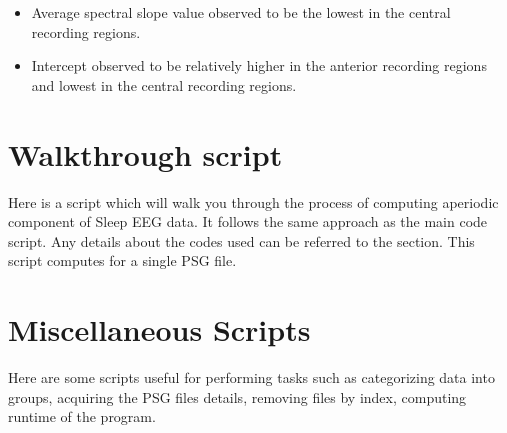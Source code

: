 \documentclass[letterpaper,10pt,english]{sphinxmanual}
\begin{document}

\sphinxAtStartPar
{}
\begin{itemize}
\item {} 
\sphinxAtStartPar
Average spectral slope value observed to be the lowest in the central recording regions.

\item {} 
\sphinxAtStartPar
Intercept observed to be relatively higher in the anterior recording regions and lowest in the central recording regions.

\end{itemize}


\chapter{Walk\sphinxhyphen{}through script}
\label{\detokenize{walk-through_script:walk-through-script}}\label{\detokenize{walk-through_script::doc}}
\sphinxAtStartPar
Here is a script which will walk you through the process of computing aperiodic component of Sleep EEG data. It follows the same approach as the main code script. Any details about the codes used can be referred to the  section. This script computes for a single PSG file.

\begin{sphinxVerbatim}[commandchars=\\\{\}]

\end{sphinxVerbatim}


\chapter{Miscellaneous Scripts}
\label{\detokenize{miscellaneous_script:miscellaneous-scripts}}\label{\detokenize{miscellaneous_script::doc}}
\sphinxAtStartPar
Here are some scripts useful for performing tasks such as categorizing data into groups, acquiring the PSG files details, removing files by index, computing runtime of the program.

\sphinxAtStartPar
{}
\end{document}
